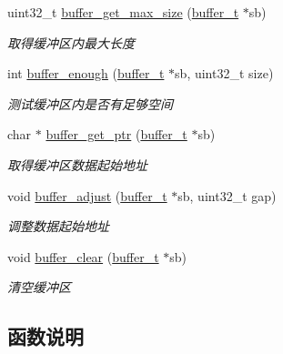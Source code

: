 \begin{DoxyCompactItemize}
uint32\+\_\+t \hyperlink{a00044_a13dfff4814bad92a4f5c263b68ddf475_a13dfff4814bad92a4f5c263b68ddf475}{buffer\+\_\+get\+\_\+max\+\_\+size} (\hyperlink{a00050_aad99a77d28bd81d3d36d0ea569c9482d_aad99a77d28bd81d3d36d0ea569c9482d}{buffer\+\_\+t} $\ast$sb)
\begin{DoxyCompactList}\small\item\em 取得缓冲区内最大长度 \end{DoxyCompactList}\item 
int \hyperlink{a00044_ae5cb663b693f41f93952c34cdd7f1f14_ae5cb663b693f41f93952c34cdd7f1f14}{buffer\+\_\+enough} (\hyperlink{a00050_aad99a77d28bd81d3d36d0ea569c9482d_aad99a77d28bd81d3d36d0ea569c9482d}{buffer\+\_\+t} $\ast$sb, uint32\+\_\+t size)
\begin{DoxyCompactList}\small\item\em 测试缓冲区内是否有足够空间 \end{DoxyCompactList}\item 
char $\ast$ \hyperlink{a00044_ab54cc02c921fa0034efe6fbd146de96c_ab54cc02c921fa0034efe6fbd146de96c}{buffer\+\_\+get\+\_\+ptr} (\hyperlink{a00050_aad99a77d28bd81d3d36d0ea569c9482d_aad99a77d28bd81d3d36d0ea569c9482d}{buffer\+\_\+t} $\ast$sb)
\begin{DoxyCompactList}\small\item\em 取得缓冲区数据起始地址 \end{DoxyCompactList}\item 
void \hyperlink{a00044_a1e574a50d7d434434bc466978601b703_a1e574a50d7d434434bc466978601b703}{buffer\+\_\+adjust} (\hyperlink{a00050_aad99a77d28bd81d3d36d0ea569c9482d_aad99a77d28bd81d3d36d0ea569c9482d}{buffer\+\_\+t} $\ast$sb, uint32\+\_\+t gap)
\begin{DoxyCompactList}\small\item\em 调整数据起始地址 \end{DoxyCompactList}\item 
void \hyperlink{a00044_a0f64078ea08b7269039ea6694f009729_a0f64078ea08b7269039ea6694f009729}{buffer\+\_\+clear} (\hyperlink{a00050_aad99a77d28bd81d3d36d0ea569c9482d_aad99a77d28bd81d3d36d0ea569c9482d}{buffer\+\_\+t} $\ast$sb)
\begin{DoxyCompactList}\small\item\em 清空缓冲区 \end{DoxyCompactList}\end{DoxyCompactItemize}


\subsection{函数说明}
\hypertarget{a00044_a1e574a50d7d434434bc466978601b703_a1e574a50d7d434434bc466978601b703}{}
